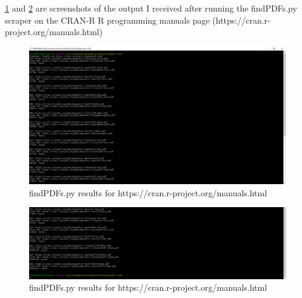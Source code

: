 \documentclass[12pt]{article}
\begin{document}
\ref{fig:q3ResponsecranR_1} and \ref{fig:q3ResponsecranR_2} are screenshots of the output I received after running the findPDFs.py scraper on the CRAN-R R programming manuals page (https://cran.r-project.org/manuals.html)
\begin{figure}[h]
    \centering
    \includegraphics[trim=0 20 10 50, clip, width=\textwidth] {Q3/q3_cranRManuals.png}
    \caption{findPDFs.py results for https://cran.r-project.org/manuals.html}
    \label{fig:q3ResponsecranR_1}
\end{figure}


\begin{figure}[h]
    \centering
    \includegraphics[trim=0 20 10 50, clip, width=\textwidth] {Q3/q3_cranRManuals2.png}
    \caption{findPDFs.py results for https://cran.r-project.org/manuals.html}
    \label{fig:q3ResponsecranR_2}
\end{figure}
\end{document}
